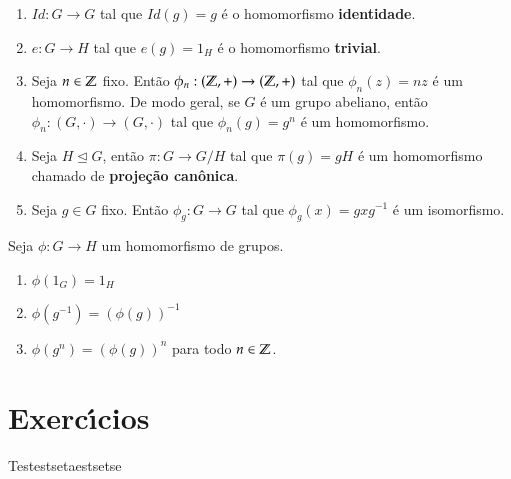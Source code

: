 \begin{exemplos}
	\begin{enumerate}[label=({\arabic*})]
		\item $Id : G \to G$ tal que $Id(g) = g$ \'e o homomorfismo \textbf{identidade}.
		\item $e : G \to H$ tal que $e(g) = 1_H$ \'e o homomorfismo \textbf{trivial}.
		\item Seja $n \in \mathbb{Z}$ fixo. Ent\~ao $\phi_n : (\mathbb{Z},+) \to (\mathbb{Z}, +)$ tal que $\phi_n(z) = nz$ \'e um homomorfismo. De modo geral, se $G$ \'e um grupo abeliano, ent\~ao $\phi_n : (G, \cdot) \to (G, \cdot)$ tal que $\phi_n(g) = g^n$ \'e um homomorfismo.
		\item Seja $H \unlhd G$, ent\~ao $\pi : G \to G/H$ tal que $\pi(g) = gH$ \'e um homomorfismo chamado de \textbf{proje\c{c}\~ao can\^onica}.
		\item Seja $g \in G$ fixo. Ent\~ao $\phi_g : G \to G$ tal que $\phi_g(x) = gxg^{-1}$ \'e um isomorfismo.
	\end{enumerate}
\end{exemplos}

\begin{lema}
	Seja $\phi : G \to H$ um homomorfismo de grupos.
	\begin{enumerate}[label=({\roman*})]
		\item $\phi(1_G) = 1_H$
		\item $\phi(g^{-1}) = (\phi(g))^{-1}$
		\item $\phi(g^n) = (\phi(g))^n$ para todo $n \in \mathbb{Z}$.
	\end{enumerate}
\end{lema}


















\section{Exerc{\'\i}cios} %
\label{sec:exercicios}
\begin{ex}
  Testestsetaestsetse
\end{ex}

